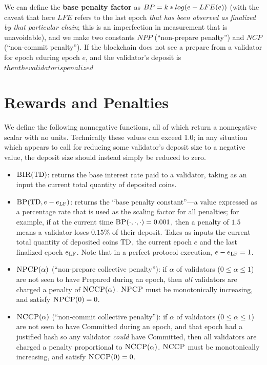 \documentclass[12pt, final]{article}
\newcommand{\epoch}{\ensuremath{e}\space}
\newcommand{\totaldeposit}{\textnormal{TD}\space}
\newcommand{\epochLF}{\ensuremath{\epoch_{\textnormal{LF}}}\space}
\newcommand{\BIR}{\textsc{BIR}\space}
\newcommand{\BP}{\textsc{BP}\space}
\newcommand{\NCCP}{\textsc{NCCP}\space}
\newcommand{\NPCP}{\textsc{NPCP}\space}
\begin{document}
We can define the \textbf{base penalty factor} as $BP = k * log(\epoch - LFE(\epoch))$ (with the caveat that here $LFE$ refers to the last epoch \textit{that has been observed as finalized by that particular chain}; this is an imperfection in measurement that is unavoidable), and we make two constants $NPP$ (``non-prepare penalty'') and $NCP$ (``non-commit penalty''). If the blockchain does not see a prepare from a validator for epoch \epoch during epoch \epoch, and the validator's deposit is $ then the validator is penalized $

\section{Rewards and Penalties}

We define the following nonnegative functions, all of which return a nonnegative scalar with no units. Technically these values can exceed 1.0; in any situation which appears to call for reducing some validator's deposit size to a negative value, the deposit size should instead simply be reduced to zero.

\begin{itemize}
\item $\BIR(\totaldeposit)$: returns the base interest rate paid to a validator, taking as an input the current total quantity of deposited coins.

\item $\BP(\totaldeposit, \epoch - \epochLF )$: returns the ``base penalty constant''---a value expressed as a percentage rate that is used as the scaling factor for all penalties; for example, if at the current time $\BP(\cdot, \cdot, \cdot) = 0.001$, then a penalty of $1.5$ means a validator loses $0.15\%$ of their deposit. Takes as inputs the current total quantity of deposited coins $\totaldeposit$, the current epoch $e$ and the last finalized epoch \epochLF. Note that in a perfect protocol execution, $\epoch - \epochLF = 1$.

\item $\NPCP(\alpha)$ (``non-prepare collective penalty''): if $\alpha$ of validators ($0 \leq \alpha \leq 1$) are not seen to have Prepared during an epoch, then \emph{all} validators are charged a penalty of $\NCCP(\alpha)$. $\NPCP$ must be monotonically increasing, and satisfy $\NPCP(0) = 0$.

\item $\NCCP(\alpha)$ (``non-commit collective penalty''): if $\alpha$ of validators ($0 \leq \alpha \leq 1$) are not seen to have Committed during an epoch, and that epoch had a justified hash so any validator \emph{could} have Committed, then all validators are charged a penalty proportional to $\NCCP(\alpha)$. $\NCCP$ must be monotonically increasing, and satisfy $\NCCP(0) = 0$.
\end{itemize}
\end{document}
